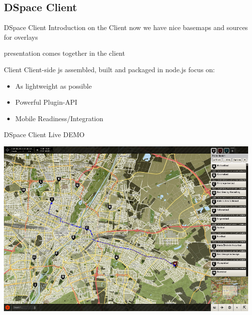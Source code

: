 \documentclass{beamer}
\begin{document}
\subsection{DSpace Client}

\begin{frame}{DSpace Client}
 Introduction on the Client
 now we have nice basemaps and sources for overlays

 presentation comes together in the client
\end{frame}

\begin{frame}{Client}
 Client-side js
 assembled, built and packaged in node.js
 focus on:
 \begin{itemize}
  \item As lightweight as possible
  \item Powerful Plugin-API
  \item Mobile Readiness/Integration
 \end{itemize}
\end{frame}

\begin{frame}{DSpace Client Live DEMO}
 \linebreak
 \begin{center}
  \includegraphics[scale=0.3]{images/dspace_client_ui}
 \end{center}
\end{frame}
\end{document}
